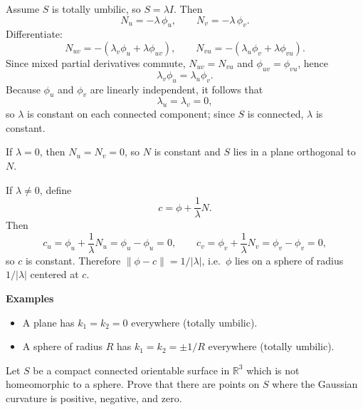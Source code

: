 \begin{solution}
Assume $S$ is totally umbilic, so $S=\lambda I$. Then
	\[
	N_u=-\lambda\,\phi_u,\qquad N_v=-\lambda\,\phi_v.
	\]
	Differentiate:
	\[
	N_{uv}=-(\lambda_v\phi_u+\lambda\phi_{uv}),\qquad
	N_{vu}=-(\lambda_u\phi_v+\lambda\phi_{vu}).
	\]
	Since mixed partial derivatives commute, $N_{uv}=N_{vu}$ and $\phi_{uv}=\phi_{vu}$, hence
	\[
	\lambda_v\phi_u=\lambda_u\phi_v.
	\]
	Because $\phi_u$ and $\phi_v$ are linearly independent, it follows that
	\[
	\lambda_u=\lambda_v=0,
	\]
	so $\lambda$ is constant on each connected component; since $S$ is connected, $\lambda$ is constant.
	
	If $\lambda=0$, then $N_u=N_v=0$, so $N$ is constant and $S$ lies in a plane orthogonal to $N$.
	
	If $\lambda\neq 0$, define
	\[
	c=\phi+\frac{1}{\lambda}N.
	\]
	Then
	\[
	c_u=\phi_u+\frac{1}{\lambda}N_u=\phi_u-\phi_u=0,\qquad
	c_v=\phi_v+\frac{1}{\lambda}N_v=\phi_v-\phi_v=0,
	\]
	so $c$ is constant. Therefore $\|\phi-c\|=1/|\lambda|$, i.e.\ $\phi$ lies on a sphere of radius
	$1/|\lambda|$ centered at $c$.
	
	\par\medskip\noindent\textbf{Examples}\par\smallskip

	\begin{itemize}
		\item A plane has $k_1=k_2=0$ everywhere (totally umbilic).
		\item A sphere of radius $R$ has $k_1=k_2=\pm 1/R$ everywhere (totally umbilic).
	\end{itemize}
	
	

		
	
\end{solution}

\begin{problem}
\label{prob:cp-vii-0053}
Let $S$ be a compact connected orientable surface in $\mathbb{R}^3$ which is not homeomorphic to a sphere.
	Prove that there are points on $S$ where the Gaussian curvature is positive, negative, and zero.
\end{problem}

